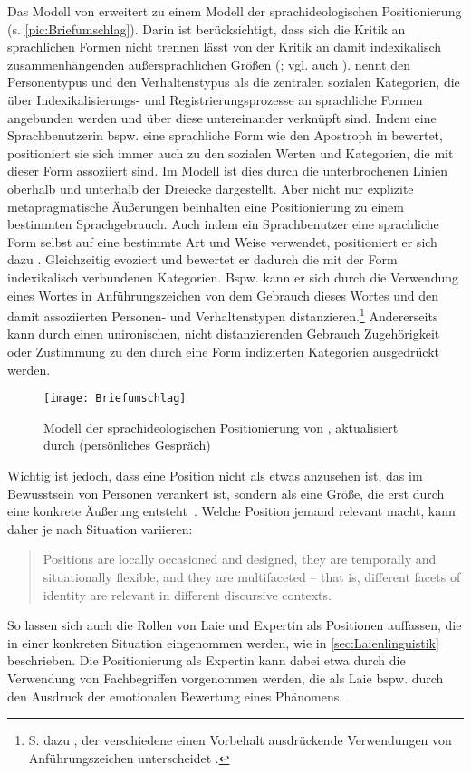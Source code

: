 Das Modell von \citet{DuBois.2007} erweitert \citet[273]{Spitzmuller2013} zu einem Modell der sprachideologischen Positionierung (s. \autoref{pic:Briefumschlag}). 
Darin ist berücksichtigt, dass sich die Kritik an sprachlichen Formen nicht trennen lässt von der Kritik an damit indexikalisch zusammenhängenden außersprachlichen Größen (\citealp[s.][257]{Spitzmuller.2005}; vgl. auch \citealp[1]{Gal.2019}). \citet[272]{Spitzmuller2013} nennt den Personentypus und den Verhaltenstypus als die zentralen sozialen Kategorien, die über Indexikalisierungs- und Registrierungsprozesse an sprachliche Formen angebunden werden und über diese untereinander verknüpft sind. 
Indem eine Sprachbenutzerin bspw. eine sprachliche Form wie den Apostroph in  bewertet, positioniert sie sich immer auch zu den sozialen Werten und Kategorien, die mit dieser Form assoziiert sind.
Im Modell ist dies durch die unterbrochenen Linien oberhalb und unterhalb der Dreiecke dargestellt. 
Aber nicht nur explizite metapragmatische Äußerungen beinhalten eine Positionierung zu einem bestimmten Sprachgebrauch. 
Auch indem ein Sprachbenutzer eine sprachliche Form selbst auf eine bestimmte Art und Weise verwendet, positioniert er sich dazu \citep[s.][270]{Spitzmuller2013}. 
Gleichzeitig evoziert und bewertet er dadurch die mit der Form indexikalisch verbundenen Kategorien. 
Bspw. kann er sich durch die Verwendung eines Wortes in Anführungszeichen von dem Gebrauch dieses Wortes und den damit assoziierten Personen- und Verhaltenstypen distanzieren.\footnote{S. dazu \citet[]{Klockow.1980}, der verschiedene einen Vorbehalt ausdrückende Verwendungen von Anführungszeichen unterscheidet \citep[vgl. auch][]{Bredel.2011}.}
Andererseits kann durch einen unironischen, nicht distanzierenden Gebrauch Zugehörigkeit oder Zustimmung zu den durch eine Form indizierten Kategorien ausgedrückt werden.

\begin{figure}
\centering
\texttt{[image: Briefumschlag]}
\caption{Modell der sprachideologischen Positionierung von \citet[273]{Spitzmuller2013}, aktualisiert durch \citeauthor{Spitzmuller2013} (persönliches Gespräch)}
\label{pic:Briefumschlag}
\end{figure}

Wichtig ist jedoch, dass eine Position nicht als etwas anzusehen ist, das im Bewusstsein von Personen verankert ist, sondern als eine Größe, die erst durch eine konkrete Äußerung entsteht~\citep[s.][369--370]{Deppermann.2015}. 
Welche Position jemand relevant macht, kann daher je nach Situation variieren: 
\begin{quote}Positions are locally occasioned and designed, they are temporally and situationally flexible, and they are multifaceted – that is, different facets of identity are relevant in different discursive contexts. \citep[370]{Deppermann.2015}\end{quote}
So lassen sich auch die Rollen von Laie und Expertin als Positionen auffassen, die in einer konkreten Situation eingenommen werden, wie in \autoref{sec:Laienlinguistik} beschrieben. Die Positionierung als Expertin kann dabei etwa durch die Verwendung von Fachbegriffen vorgenommen werden, die als Laie bspw. durch den Ausdruck der emotionalen Bewertung eines Phänomens. 

